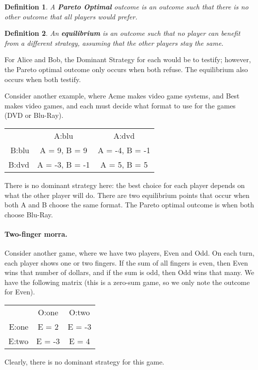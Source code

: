 \documentclass[10pt,a4paper]{article}
\newtheorem{defin}{Definition}
\begin{document}
\begin{defin}
A \emph{\textbf{Pareto Optimal}} outcome is an outcome such that there is no other outcome that all players would prefer.
\end{defin}

\begin{defin}
An \emph{\textbf{equilibrium}} is an outcome such that no player can benefit from a different strategy, assuming that the other players stay the same.
\end{defin}

For Alice and Bob, the Dominant Strategy for each would be to testify; however, the Pareto optimal outcome only occurs when both refuse. The equilibrium also occurs when both testify.

Consider another example, where Acme makes video game systems, and Best makes video games, and each must decide what format to use for the games (DVD or Blu-Ray).
\begin{center}
\begin{tabular}{r|c|c|}
\multicolumn{1}{r}{} & \multicolumn{1}{c}{A:blu} & \multicolumn{1}{c}{A:dvd} \\
\cline{2-3}
B:blu & A = 9, B = 9 & A = -4, B = -1 \\
\cline{2-3}
B:dvd & A = -3, B = -1 & A = 5, B = 5 \\
\cline{2-3}
\end{tabular}
\end{center}
There is no dominant strategy here: the best choice for each player depends on what the other player will do. There are two equilibrium points that occur when both A and B choose the same format. The Pareto optimal outcome is when both choose Blu-Ray.

\paragraph{Two-finger morra.} Consider another game, where we have two players, Even and Odd. On each turn, each player shows one or two fingers. If the sum of all fingers is even, then Even wins that number of dollars, and if the sum is odd, then Odd wins that many. We have the following matrix (this is a zero-sum game, so we only note the outcome for Even).
\begin{center}
\begin{tabular}{r|c|c|}
\multicolumn{1}{r}{} & \multicolumn{1}{c}{O:one} & \multicolumn{1}{c}{O:two} \\
\cline{2-3}
E:one & E = 2 & E = -3 \\
\cline{2-3}
E:two & E = -3 & E = 4 \\
\cline{2-3}
\end{tabular}
\end{center}
Clearly, there is no dominant strategy for this game.
\end{document}

